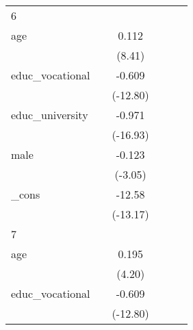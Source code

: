 {\begin{tabular}{l*{5}{c}}
\hline
6           &                     &                     &                     &                     &                     \\
age         &                     &       0.112\sym{***}&                     &                     &                     \\
            &                     &      (8.41)         &                     &                     &                     \\
[1em]
educ\_vocational&                     &      -0.609\sym{***}&                     &                     &                     \\
            &                     &    (-12.80)         &                     &                     &                     \\
[1em]
educ\_university&                     &      -0.971\sym{***}&                     &                     &                     \\
            &                     &    (-16.93)         &                     &                     &                     \\
[1em]
male        &                     &      -0.123\sym{**} &                     &                     &                     \\
            &                     &     (-3.05)         &                     &                     &                     \\
[1em]
\_cons      &                     &      -12.58\sym{***}&                     &                     &                     \\
            &                     &    (-13.17)         &                     &                     &                     \\
\hline
7           &                     &                     &                     &                     &                     \\
age         &                     &       0.195\sym{***}&                     &                     &                     \\
            &                     &      (4.20)         &                     &                     &                     \\
[1em]
educ\_vocational&                     &      -0.609\sym{***}&                     &                     &                     \\
            &                     &    (-12.80)         &                     &                     &                     \\

\end{tabular}}
